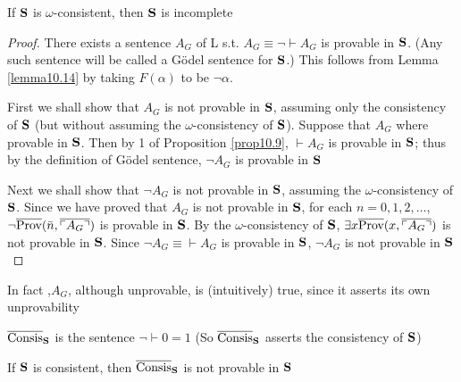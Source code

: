 \documentclass[11pt]{article}
\def \Prov {\text{Prov}}
\def \oveConsis {\ove{\text{Consis}}}
\def \oveConsisS {\ove{\text{Consis}}_{\bS}}
\newcommand{\ovecor}[1] {\ove{\ucorner{#1}}}
\begin{document}
\begin{theorem}
\label{thm10.16}
If \(\operatorname{\textbf{S}}\) is \(\omega\)-consistent, then \(\operatorname{\textbf{S}}\) is incomplete
\end{theorem}

\begin{proof}
There exists a sentence \(A_G\) of L s.t. \(A_G\equiv\neg\vdash A_G\) is provable in \(\operatorname{\textbf{S}}\).
(Any such sentence will be called a Gödel sentence for \(\operatorname{\textbf{S}}\).) This follows from Lemma
\ref{lemma10.14} by taking \(F(\alpha)\) to be \(\neg\alpha\).

First we shall show that \(A_G\) is not provable in \(\operatorname{\textbf{S}}\), assuming only the consistency
of \(\operatorname{\textbf{S}}\) (but without assuming the \(\omega\)-consistency of \(\operatorname{\textbf{S}}\)). Suppose that \(A_G\)
where provable in \(\operatorname{\textbf{S}}\). Then by 1 of Proposition \ref{prop10.9}, \(\vdash A_G\) is provable
in \(\operatorname{\textbf{S}}\); thus by the definition of Gödel sentence, \(\neg A_G\) is provable in \(\operatorname{\textbf{S}}\)

Next we shall show that \(\neg A_G\) is not provable in \(\operatorname{\textbf{S}}\), assuming the \(\omega\)-consistency
of \(\operatorname{\textbf{S}}\). Since we have proved that \(A_G\) is not provable in \(\operatorname{\textbf{S}}\), for
each \(n=0,1,2,\dots\), \(\neg\ove{\Prov}(\barn,\ovecor{A_G})\) is provable in \(\operatorname{\textbf{S}}\). By
the \(\omega\)-consistency of \(\operatorname{\textbf{S}}\), \(\exists x\ove{\Prov}(x,\ovecor{A_G})\) is not provable
in \(\operatorname{\textbf{S}}\). Since \(\neg A_G\equiv\vdash A_G\) is provable in \(\operatorname{\textbf{S}}\), \(\neg A_G\) is not provable in \(\operatorname{\textbf{S}}\)
\end{proof}

In fact ,\(A_G\), although unprovable, is (intuitively) true, since it asserts its own unprovability

\begin{definition}[]
\(\oveConsis_{\bS}\) is the sentence \(\neg\vdash0=1\) (So \(\oveConsis_{\bS}\) asserts the
consistency of \(\operatorname{\textbf{S}}\))
\end{definition}

\begin{theorem}
If \(\operatorname{\textbf{S}}\) is consistent, then \(\oveConsisS\) is not provable in \(\operatorname{\textbf{S}}\)
\end{theorem}
\end{document}
